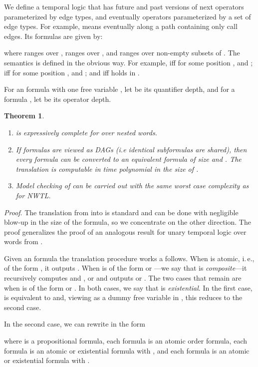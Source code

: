 \documentclass{LMCS}
\theoremstyle{plain}
\newtheorem{theorem}{Theorem}[section]
\theoremstyle{definition}
\newcommand{\ie}{i.\,e.}
\newcounter{example}
\begin{document}
We define a temporal logic   that has
future and past versions of next operators parameterized by edge types,
and eventually operators parameterized
by a set of edge types. 
For example,  means eventually along
a path containing only call edges.
Its formulas are given by:

where  ranges over ,  ranges over ,  and  ranges over non-empty subsets of 
. 
The semantics is defined in the obvious way.  For example,
 iff 
for some position ,   and 
;  
iff for some position ,   and ;
and  iff  holds in .


For an  formula  with one free variable , let
 be its quantifier depth,
and for a  formula ,  let  
be its operator depth.

\begin{theorem} 
  \label{translation theorem}\hfil
\begin{enumerate}[\em(1)]
\item  {} is expressively complete for  over nested words.

\item If formulas are viewed as DAGs (i.e identical subformulas are shared), then
every  formula  can be converted to an equivalent
  {} formula 
of size  and .
  The translation is computable in time polynomial in
  the size of .
\item Model checking of  can be carried out with the
same worst case complexity as for NWTL.
\end{enumerate}
\end{theorem}

{\em Proof}.
The translation from   into  is standard and can be
done with negligible blow-up in the size of the formula, so we
concentrate on the other direction.
The proof generalizes the proof of an analogous result
 for unary temporal logic over words from \cite{EVW02}. 

Given an  formula  the translation procedure works
a follows. When  is atomic, \ie, of the form , it
outputs .  When  is of the form 
or ---we say that  is \emph{composite}---it
recursively computes  and , or  and outputs
 or .  The two cases that remain are
when  is of the form  or . In both cases, we say that  is
\emph{existential}. In the first case,  is equivalent to
 and, viewing  as a dummy free variable in
, this reduces to the second case.
  
In the second case, we can rewrite  in the form

where  is a propositional formula, each formula  is an
atomic order formula, each formula  is an atomic or existential
 formula with , and each formula
 is an atomic or existential  formula with
.
  
\end{document}
